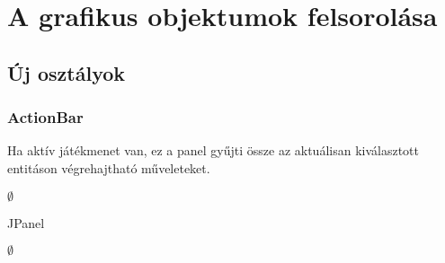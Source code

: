 \documentclass[../../projlab]{subfiles}
\begin{document}
\section{A grafikus objektumok felsorolása}

\subsection{Új osztályok}

\subsubsection{ActionBar}
\begin{class-template-responsibility}
    Ha aktív játékmenet van, ez a panel gyűjti össze az aktuálisan kiválasztott entitáson végrehajtható műveleteket.  
\end{class-template-responsibility}
\begin{class-template-interface}
    $\emptyset$
\end{class-template-interface}
\begin{class-template-baseclass}
    JPanel
\end{class-template-baseclass}
\begin{class-template-attribute}
    \item[] $\emptyset$
\end{class-template-attribute} 
\begin{class-template-method}
\end{class-template-method}
\end{document}
